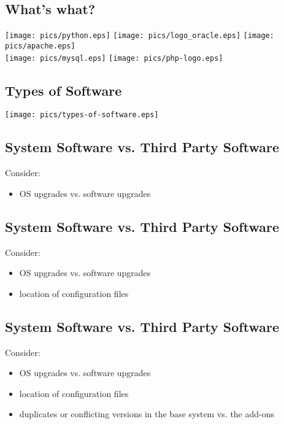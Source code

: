 \documentclass[xga]{xdvislides}
\begin{document}
\subsection{What's what?}
\begin{center}
	\texttt{[image: pics/python.eps]}
	\texttt{[image: pics/logo\_oracle.eps]}
	\texttt{[image: pics/apache.eps]} \\
	\texttt{[image: pics/mysql.eps]}
	\texttt{[image: pics/php-logo.eps]}
\end{center}

\subsection{Types of Software}
\vfill
\begin{center}
	\texttt{[image: pics/types-of-software.eps]}
\end{center}
\vfill




\subsection{System Software vs. Third Party Software}
Consider:
\begin{itemize}
	\item OS upgrades vs. software upgrades
\end{itemize}

\subsection{System Software vs. Third Party Software}
Consider:
\begin{itemize}
	\item OS upgrades vs. software upgrades
	\item location of configuration files
\end{itemize}

\subsection{System Software vs. Third Party Software}
Consider:
\begin{itemize}
	\item OS upgrades vs. software upgrades
	\item location of configuration files
	\item duplicates or conflicting versions in the base system vs. the
		add-ons
\end{itemize}
\end{document}
